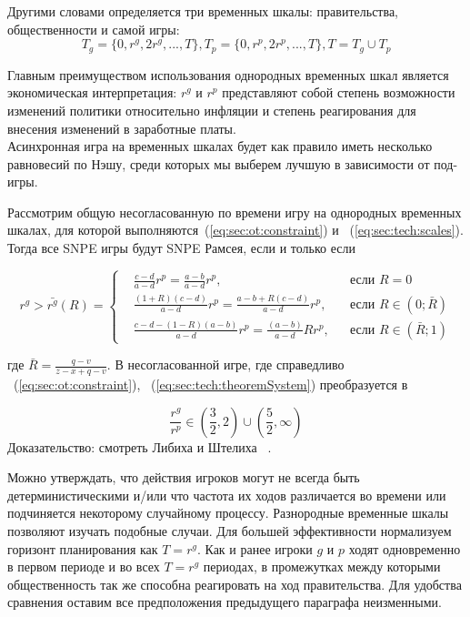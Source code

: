 Другими словами определяется три временных шкалы: правительства, общественности и самой игры:
\begin{equation}
\label{eq:sec:tech:scales}
T_g = \{0,r^g,2r^g,...,T\}, T_p=\{0,r^p,2r^p,...,T\}, T=T_g\cup T_p 
\end{equation}

Главным преимуществом использования однородных временных шкал является экономическая интерпретация: $r^g$ и $r^p$ представляют собой степень возможности изменений политики относительно инфляции и степень реагирования для внесения изменений в заработные платы.
\\

Асинхронная игра на временных шкалах будет как правило иметь несколько равновесий по Нэшу, среди которых мы выберем лучшую в зависимости от под-игры.

\begin{theorem}
	Рассмотрим общую несогласованную по времени игру на однородных временных шкалах, для которой выполняются~(\ref{eq:sec:ot:constraint}) и ~(\ref{eq:sec:tech:scales}). Тогда все SNPE игры будут SNPE Рамсея, если и только если
	
	\begin{equation}
	\label{eq:sec:tech:theoremSystem}
	r^g> \bar{r^g}(R) = \left\{ 
	\begin{aligned} 
	&\frac{c - d}{a-d}r^p= \frac{a-b}{a-d}r^p, &&\text{если } R=0
	\\
	&\frac{(1+R)(c-d)}{a-d}r^p= \frac{a-b + R(c-d)}{a-d}r^p, &&\text{если } 	R\in(0; \bar{R})
	\\
	&\frac{c-d-(1-R)(a-b)}{a-d}r^p= \frac{(a-b)}{a-d}Rr^p, &&\text{если } 	R\in(\bar{R};1)
	\end{aligned}
	\right.		
	\end{equation}
\end{theorem}
где $\bar{R}=\frac{q-v}{z-x+q-v}$. В несогласованной игре, где справедливо ~(\ref{eq:sec:ot:constraint}),  ~(\ref{eq:sec:tech:theoremSystem}) преобразуется в 

\begin{equation}
\frac{r^g}{r^p} \in \left(\frac{3}{2}, 2\right)\cup \left(\frac{5}{2}, \infty\right)
\end{equation}
Доказательство: смотреть Либиха и Штелиха ~\cite{libichIncorpo}.


Можно утверждать, что действия игроков могут не всегда быть детерминистическими и/или что частота их ходов различается во времени или подчиняется некоторому случайному процессу. Разнородные временные шкалы позволяют изучать подобные случаи. Для большей эффективности нормализуем горизонт планирования как $T = r^g$. Как и ранее игроки $g$ и $p$ ходят одновременно в первом периоде и во всех $T = r^g$ периодах, в промежутках между которыми общественность так же способна реагировать на ход правительства. Для удобства сравнения оставим все предположения предыдущего параграфа неизменными.

